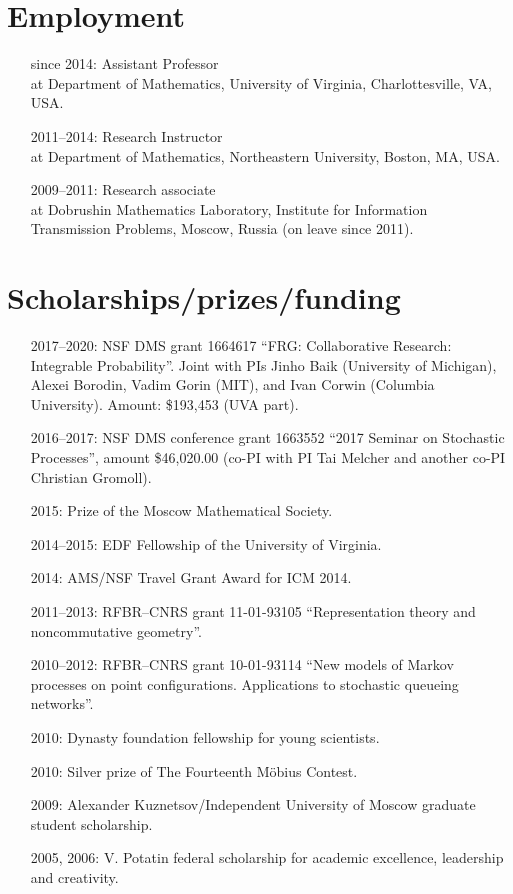 \documentclass[letterpaper,11pt]{article}
\begin{document}
\section*{Employment}

\begin{itemize}
\item[since 2014:]
Assistant Professor\\
at Department of Mathematics, 
University of Virginia, 
Charlottesville, VA, USA.

\item[2011--2014:]
Research Instructor\\ at
Department of Mathematics,
Northeastern University, Boston, MA, USA.

\item[2009--2011:]
Research associate\\
at
Dobrushin Mathematics Laboratory,
Institute for Information Transmission Problems, Moscow, Russia (on leave since 2011).
\end{itemize}

\section*{Scholarships/prizes/funding}
\begin{itemize}
	\item[2017--2020:] NSF DMS grant 1664617
		``FRG: Collaborative Research: Integrable Probability''.
		Joint with PIs Jinho Baik (University of Michigan), 
		Alexei Borodin, Vadim Gorin (MIT),
		and Ivan Corwin (Columbia University).
		Amount: \$193,453 (UVA part).
	\item[2016--2017:]
	NSF DMS conference grant 1663552 ``2017 Seminar on Stochastic Processes'', amount \$46,020.00
	(co-PI with PI Tai Melcher and another co-PI Christian Gromoll).
	\item[2015:] Prize of the Moscow Mathematical Society.
	\item[2014--2015:] EDF Fellowship of the University of Virginia. 
	\item[2014:] AMS/NSF Travel Grant Award for ICM 2014.
	\item[2011--2013:] RFBR--CNRS grant 11-01-93105 ``Representation theory and noncommutative geometry''.
	\item[2010--2012:] RFBR--CNRS grant 10-01-93114 ``New models of Markov processes on point configurations. Applications to stochastic queueing networks''.
	\item[2010:] Dynasty foundation fellowship for young scientists.
	\item[2010:] Silver prize of The Fourteenth M\"obius Contest.
	\item[2009:] Alexander Kuznetsov/Independent University of Moscow graduate student scholarship.
	\item[2005, 2006:] V. Potatin federal scholarship for academic excellence, leadership and creativity.
\end{itemize}
\end{document}
